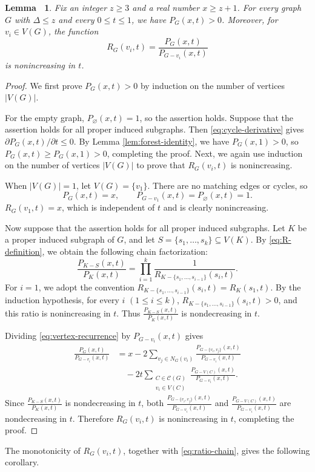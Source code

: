 \documentclass[11pt, a4paper]{article}
\theoremstyle{plain}
\newtheorem{lemma}{Lemma\ }[section]
\begin{document}
\begin{lemma}\label{lem:monotonicity}
Fix an integer $z\geq3$ and a real number $x\geq z+1$.
For every graph $G$ with $\Delta \leq z$ and every $0\leq t\leq1$, we have $P_G(x,t)>0$.
Moreover, for $v_i\in V(G)$, the function
\begin{equation}\label{eq:R-definition}
 R_G(v_i,t)=\frac{P_G(x,t)}{P_{G-v_i}(x,t)}
\end{equation}
is nonincreasing in $t$.
\end{lemma}

\begin{proof}
We first prove $P_G(x,t)>0$ by induction on the number of vertices $|V(G)|$.

For the empty graph, $P_\varnothing(x,t)=1$, so the assertion holds.
Suppose that the assertion holds for all proper induced subgraphs.
Then \eqref{eq:cycle-derivative} gives $\partial P_G(x,t)/\partial t\leq0$.
By Lemma \ref{lem:forest-identity}, we have $P_G(x,1)>0$,
so $P_G(x,t)\geq P_G(x,1)>0$, completing the proof.
Next, we again use induction on the number of vertices $|V(G)|$ to prove that $R_G(v_i,t)$ is nonincreasing.

When $|V(G)|=1$, let $V(G)=\{v_1\}$. There are no matching edges or cycles, so
\[
P_G(x,t)=x, \qquad P_{G-v_1}(x,t)=P_\varnothing(x,t)=1.
\]
$R_G(v_1,t)=x$,
which is independent of $t$ and is clearly nonincreasing.

Now suppose that the assertion holds for all proper induced subgraphs.
Let $K$ be a proper induced subgraph of $G$, and let $S=\{s_1,\ldots,s_k\}\subseteq V(K)$.
By \eqref{eq:R-definition}, we obtain the following chain factorization:
\begin{equation}\label{eq:ratio-chain}
 \frac{P_{K-S}(x,t)}{P_K(x,t)}
 =\prod_{i=1}^{k}
 \frac{1}{R_{K-\{s_1,\ldots,s_{i-1}\}}(s_i,t)}.
\end{equation}
For $i=1$, we adopt the convention
$R_{K-\{s_1,\ldots,s_{i-1}\}}(s_i,t)=R_K(s_1,t)$.
By the induction hypothesis, for every $i$ $(1\leq i \leq k)$,
$R_{K-\{s_1,\ldots,s_{i-1}\}}(s_i,t)>0$, and this ratio is nonincreasing in $t$.
Thus $\frac{P_{K-S}(x,t)}{P_K(x,t)}$ is nondecreasing in $t$.

Dividing \eqref{eq:vertex-recurrence} by $P_{G-v_i}(x,t)$ gives
\begin{equation}\label{eq:6}
\begin{split}
\frac{P_G(x,t)}{P_{G-v_i}(x,t)} &= x - 2 \sum_{v_j \in N_G(v_i)} \frac{P_{G-\{v_i,v_j\}}(x,t)}{P_{G-v_i}(x,t)} \\
&\quad - 2t \sum_{\substack{C \in \mathcal{C}(G) \\ v_i \in V(C)}} \frac{P_{G-V(C)}(x,t)}{P_{G-v_i}(x,t)}.
\end{split}
\end{equation}
Since $\frac{P_{K-S}(x,t)}{P_K(x,t)}$ is nondecreasing in $t$,
both $\frac{P_{G-\{v_i,v_j\}}(x,t)}{P_{G-v_i}(x,t)}$ 
and $\frac{P_{G-V(C)}(x,t)}{P_{G-v_i}(x,t)}$ are nondecreasing in $t$.
Therefore $R_G(v_i,t)$ is nonincreasing in $t$, completing the proof.
\end{proof}
The monotonicity of $R_G(v_i,t)$, together with \eqref{eq:ratio-chain}, gives the following corollary.
\end{document}
